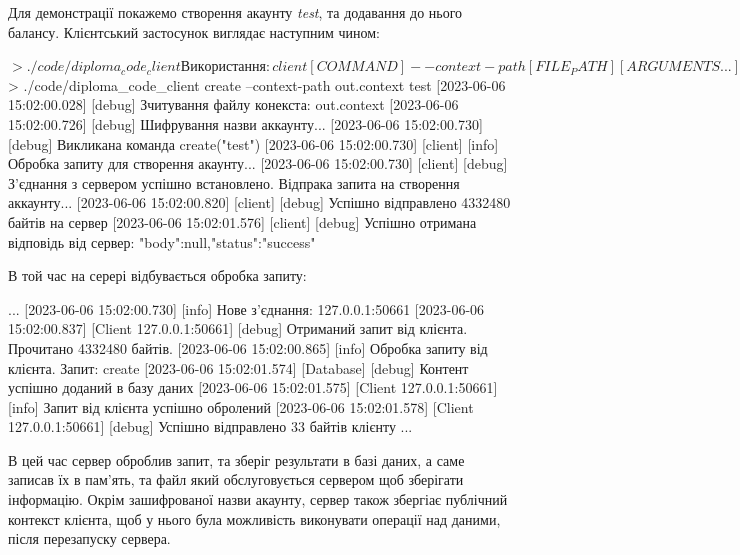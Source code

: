Для демонстрації покажемо створення акаунту \emph{test}, та додавання до нього балансу.
Клієнтський застосунок виглядає наступним чином:
\begin{spverbatim}
$> ./code/diploma_code_client
Використання: client [COMMAND] --context-path [FILE_PATH] [ARGUMENTS...]
Команди:
  get           Отримати інформацію про аккаунт
      Параметри: <Назва аккаунту>

  create        Створює новий аккаунт
      Параметри: <Назва аккаунту>

  add           Додати баланс на аккаунт
      Параметри: <Назва аккаунту> <Кількість балансу>

  withdraw      Зняти баланс з аккаунту
      Параметри: <Назва аккаунту> <Кількість балансу>
$> ./code/diploma_code_client create --context-path out.context test
[2023-06-06 15:02:00.028] [debug] Зчитування файлу конекста: out.context
[2023-06-06 15:02:00.726] [debug] Шифрування назви аккаунту...
[2023-06-06 15:02:00.730] [debug] Викликана команда create("test")
[2023-06-06 15:02:00.730] [client] [info] Обробка запиту для створення акаунту...
[2023-06-06 15:02:00.730] [client] [debug] З'єднання з сервером успішно встановлено. Відпрака запита на створення аккаунту...
[2023-06-06 15:02:00.820] [client] [debug] Успішно відправлено 4332480 байтів на сервер
[2023-06-06 15:02:01.576] [client] [debug] Успішно отримана відповідь від сервер: {"body":null,"status":"success"}
\end{spverbatim}

В той час на серері відбувається обробка запиту:
\begin{spverbatim}
...
[2023-06-06 15:02:00.730] [info] Нове з'єднання: 127.0.0.1:50661
[2023-06-06 15:02:00.837] [Client 127.0.0.1:50661] [debug] Отриманий запит від клієнта. Прочитано 4332480 байтів.
[2023-06-06 15:02:00.865] [info] Обробка запиту від клієнта. Запит: create
[2023-06-06 15:02:01.574] [Database] [debug] Контент успішно доданий в базу даних
[2023-06-06 15:02:01.575] [Client 127.0.0.1:50661] [info] Запит від клієнта успішно обролений
[2023-06-06 15:02:01.578] [Client 127.0.0.1:50661] [debug] Успішно відправлено 33 байтів клієнту
...
\end{spverbatim}
В цей час сервер оброблив запит, та зберіг результати в базі даних, а саме записав їх
в пам'ять, та файл який обслуговується сервером щоб зберігати інформацію. Окрім
зашифрованої назви акаунту, сервер також збергіає публічний контекст клієнта, щоб
у нього була можливість виконувати операції над даними, після перезапуску сервера.

